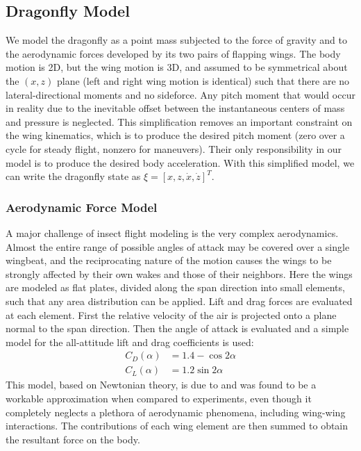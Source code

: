 \documentclass[12pt]{article}
\begin{document}
\subsection{Dragonfly Model}

We model the dragonfly as a point mass subjected to the force of
gravity and to the aerodynamic forces developed by its two
pairs of flapping wings. The body motion is 2D, but the wing motion
is 3D, and assumed to be symmetrical about the $(x,z)$ plane
(left and right wing motion is identical) such that there are
no lateral-directional moments and no sideforce. Any pitch
moment that would occur in reality due to the inevitable
offset between the instantaneous centers of mass and pressure
is neglected. This simplification removes an important constraint
on the wing kinematics, which is to produce the desired pitch moment
(zero over a cycle for steady flight, nonzero for maneuvers).
Their only responsibility in our model is to produce the desired body
acceleration. With this simplified model, we can write the dragonfly
state as $\xi = [x, z, \dot{x}, \dot{z}]^T$.

\subsubsection{Aerodynamic Force Model}

A major challenge of insect flight modeling is the very complex
aerodynamics. Almost the entire range of possible angles of
attack may be covered over a single wingbeat, and the reciprocating
nature of the motion causes the wings to be strongly affected by
their own wakes and those of their neighbors.
Here the wings are modeled as flat plates, divided along the span
direction into small elements, such that any area distribution
can be applied. Lift and drag forces are evaluated at each element.
First the relative velocity of the air is projected onto a plane normal
to the span direction. Then the angle of attack is evaluated
and a simple model for the all-attitude lift and drag
coefficients is used:
\begin{align}
    C_D(\alpha) &= 1.4 - \cos{2\alpha} \\
    C_L(\alpha) &= 1.2 \sin{2\alpha}
\end{align}
This model, based on Newtonian theory, is due to \cite{wang2004} and
was found to be a workable approximation when compared to experiments,
even though it completely neglects a plethora of aerodynamic phenomena,
including wing-wing interactions. The contributions of each wing element
are then summed to obtain the resultant force on the body.
\end{document}
